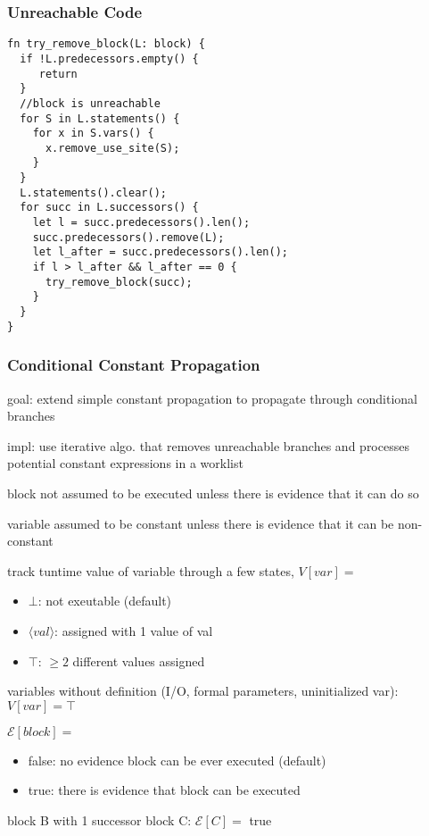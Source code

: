 \documentclass[8pt]{extarticle}
\begin{document}
\begin{multicols*}{2}
  \subsubsection{Unreachable Code}

\begin{verbatim}
fn try_remove_block(L: block) {
  if !L.predecessors.empty() {
     return
  }
  //block is unreachable
  for S in L.statements() {
    for x in S.vars() {
      x.remove_use_site(S);
    }
  }
  L.statements().clear();
  for succ in L.successors() {
    let l = succ.predecessors().len();
    succ.predecessors().remove(L);
    let l_after = succ.predecessors().len();
    if l > l_after && l_after == 0 {
      try_remove_block(succ);
    }
  }
}
\end{verbatim}

  \subsubsection{Conditional Constant Propagation}

  goal: extend simple constant propagation to propagate through conditional branches

  impl: use iterative algo. that removes unreachable branches and processes potential constant expressions in a worklist

  block not assumed to be executed unless there is evidence that it can do so

  variable assumed to be constant unless there is evidence that it can be non-constant

  track tuntime value of variable through a few states, $V[var]=$
  \begin{itemize}
  \item $\bot$: not exeutable (default)
  \item $\langle val \rangle$: assigned with 1 value of val
  \item $\top$: $\geq 2$ different values assigned
  \end{itemize}
  variables without definition (I/O, formal parameters, uninitialized var): $V[var]=\top$

  $\mathcal{E}[block]=$
  \begin{itemize}
  \item false: no evidence block can be ever executed (default)
  \item true: there is evidence that block can be executed
  \end{itemize}

  block B with 1 successor block C: $\mathcal{E}[C]=$ true


\end{multicols*}
\end{document}
